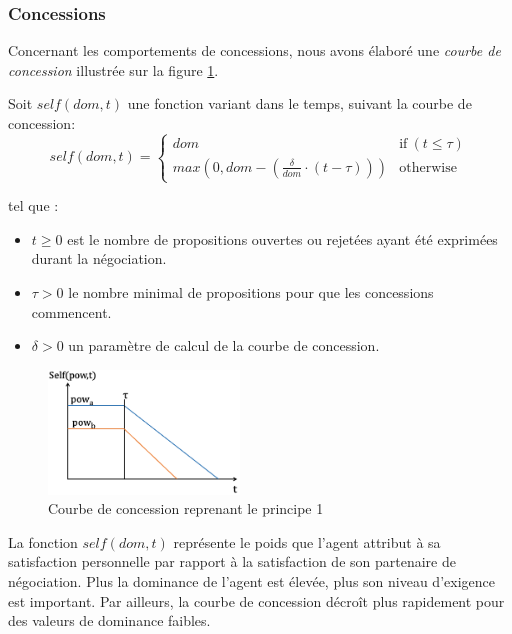 	\subsubsection{Concessions}
	
	Concernant les comportements de concessions, nous avons élaboré une \emph {courbe de concession} illustrée sur la figure \ref{fig:conc}. 
	

	Soit $ self (dom, t) $ une fonction variant dans le temps, suivant la courbe de concession:
	\begin{equation}
	self(dom, t) = \left\{\begin{array}{ll}
	dom & \mathrm{if\ } (t \leq \tau)\\
	max(0, dom - (\frac{\delta}{dom} \cdot (t - \tau))) & \mathrm{otherwise}
	\end{array}\right.
	\end{equation}
	
	
	
	tel que :
	\begin{itemize}
		\item $t \geq 0$ est le nombre de propositions ouvertes ou rejetées ayant été exprimées durant la négociation.
		\item $\tau > 0$ le nombre minimal de propositions pour que les concessions commencent.
		\item  $\delta > 0$ un paramètre de calcul de la courbe de concession.
		
	\end{itemize}  
			

	
		\begin{figure}[h]
			\includegraphics[width=2in]{Figures/chap4/self.png}
			\caption{\label{fig:conc}Courbe de concession reprenant le principe 1}
		\end{figure} 
		
		La fonction $self(dom,t)$ représente le poids que l'agent attribut à sa satisfaction personnelle par rapport à la satisfaction de son partenaire de négociation. Plus la dominance de l'agent est élevée, plus son niveau d'exigence est important. Par ailleurs, la courbe de concession décroît plus rapidement pour des valeurs de dominance faibles.
		

